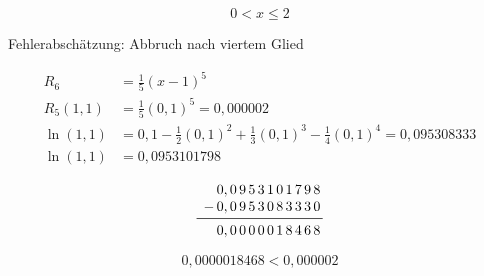 \[
	0 < x \leq 2
\]

Fehlerabschätzung: Abbruch nach viertem Glied

\begin{align*}
	R_6       & = \frac{1}{5} {(x - 1)}^5                                                                   \\
	R_5(1,1)  & = \frac{1}{5} {(0,1)}^5 = 0,000002                                                          \\
	\ln (1,1) & = 0,1 - \frac{1}{2} {(0,1)}^2 + \frac{1}{3} {(0,1)}^3 - \frac{1}{4} {(0,1)}^4 = 0,095308333 \\
	\ln (1,1) & = 0,0953101798
\end{align*}

\[
	\begin{array}{*{12}{c@{\,}}}
		  & 0, & 0 & 9 & 5 & 3 & 1 & 0 & 1 & 7 & 9 & 8 \\
		- & 0, & 0 & 9 & 5 & 3 & 0 & 8 & 3 & 3 & 3 & 0 \\
		\midrule
		  & 0, & 0 & 0 & 0 & 0 & 0 & 1 & 8 & 4 & 6 & 8
	\end{array}
\]

\[
	0,0000018468 < 0,000002
\]
